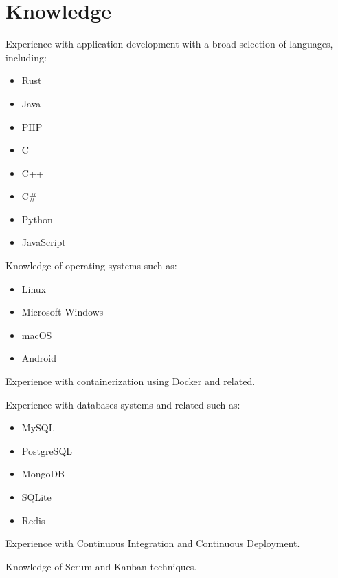 \documentclass[]{friggeri-cv}
\providecommand{\tightlist}{%
\setlength{\itemsep}{0pt}\setlength{\parskip}{0pt}}
\begin{document}
\section{Knowledge}

Experience with application development with a broad selection of
languages, including:

\begin{multicols}{3}
\begin{itemize}
  \tightlist{}
  \item Rust
  \item Java
  \item PHP
  \item C
  \item C++
  \item C\#
  \item Python
  \item JavaScript
\end{itemize}
\end{multicols}

Knowledge of operating systems such as:

\begin{multicols}{3}
\begin{itemize}
  \tightlist{}
  \item Linux
  \item Microsoft Windows
  \item macOS
  \item Android
\end{itemize}
\end{multicols}

Experience with containerization using Docker and related.

Experience with databases systems and related such as:

\begin{multicols}{3}
\begin{itemize}
  \tightlist{}
  \item MySQL
  \item PostgreSQL
  \item MongoDB
  \item SQLite
  \item Redis
\end{itemize}
\end{multicols}

Experience with Continuous Integration and Continuous Deployment.

Knowledge of Scrum and Kanban techniques.
\end{document}
